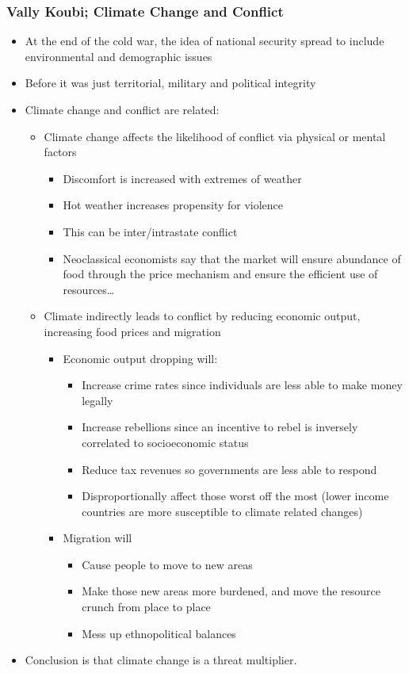 \documentclass[11pt]{article}
\begin{document}
\subsubsection{Vally Koubi; Climate Change and Conflict}
\label{sec:orga58f728}
\begin{itemize}
\item At the end of the cold war, the idea of national security spread to include
environmental and demographic issues
\item Before it was just territorial, military and political integrity
\item Climate change and conflict are related:
\begin{itemize}
\item Climate change affects the likelihood of conflict via physical or mental factors
\begin{itemize}
\item Discomfort is increased with extremes of weather
\item Hot weather increases propensity for violence
\item This can be inter/intrastate conflict
\item Neoclassical economists say that the market will ensure abundance of food
through the price mechanism and ensure the efficient use of resources\ldots{}
\end{itemize}
\item Climate indirectly leads to conflict by reducing economic output, increasing
food prices and migration
\begin{itemize}
\item Economic output dropping will:
\begin{itemize}
\item Increase crime rates since individuals are less able to make money legally
\item Increase rebellions since an incentive to rebel is inversely correlated
to socioeconomic status
\item Reduce tax revenues so governments are less able to respond
\item Disproportionally affect those worst off the most (lower income
countries are more susceptible to climate related changes)
\end{itemize}
\item Migration will
\begin{itemize}
\item Cause people to move to new areas
\item Make those new areas more burdened, and move the resource crunch from
place to place
\item Mess up ethnopolitical balances
\end{itemize}
\end{itemize}
\end{itemize}
\item Conclusion is that climate change is a threat multiplier.
\end{itemize}
\end{document}
